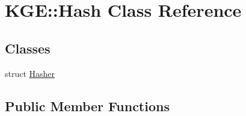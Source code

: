 \hypertarget{class_k_g_e_1_1_hash}{\section{K\-G\-E\-:\-:Hash Class Reference}
\label{class_k_g_e_1_1_hash}
}
\subsection*{Classes}
\begin{DoxyCompactItemize}
\item 
struct \hyperlink{struct_k_g_e_1_1_hash_1_1_hasher}{Hasher}
\end{DoxyCompactItemize}
\subsection*{Public Member Functions}
